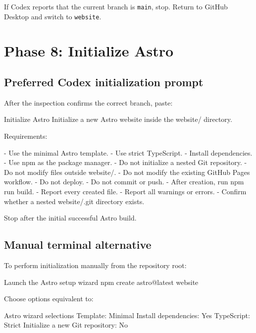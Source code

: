 \documentclass[11pt,letterpaper]{article}
\newcommand{\branchname}[1]{\texttt{#1}}
\begin{document}
\begin{warningbox}
If Codex reports that the current branch is \branchname{main}, stop.
Return to GitHub Desktop and switch to \branchname{website}.
\end{warningbox}

\section{Phase 8: Initialize Astro}

\subsection{Preferred Codex initialization prompt}

After the inspection confirms the correct branch, paste:

\begin{promptbox}{Initialize Astro}
Initialize a new Astro website inside the website/ directory.

Requirements:

- Use the minimal Astro template.
- Use strict TypeScript.
- Install dependencies.
- Use npm as the package manager.
- Do not initialize a nested Git repository.
- Do not modify files outside website/.
- Do not modify the existing GitHub Pages workflow.
- Do not deploy.
- Do not commit or push.
- After creation, run npm run build.
- Report every created file.
- Report all warnings or errors.
- Confirm whether a nested website/.git directory exists.

Stop after the initial successful Astro build.
\end{promptbox}

\subsection{Manual terminal alternative}

To perform initialization manually from the repository root:

\begin{commandbox}{Launch the Astro setup wizard}
npm create astro@latest website
\end{commandbox}

Choose options equivalent to:

\begin{codebox}{Astro wizard selections}
Template: Minimal
Install dependencies: Yes
TypeScript: Strict
Initialize a new Git repository: No
\end{codebox}
\end{document}

